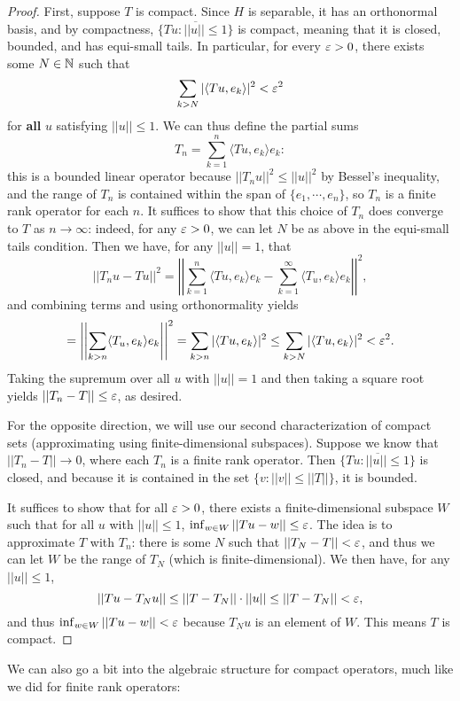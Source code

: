 \begin{proof}
First, suppose $T$ is compact. Since $H$ is separable, it has an orthonormal basis, and by compactness, $\overline{\{Tu: ||u|| \le 1\}}$ is compact, meaning that it is closed, bounded, and has equi-small tails. In particular, for every $\varepsilon > 0$, there exists some $N \in \mathbb N$ such that 
\[
    \sum_{k>N}|\langle Tu, e_k \rangle|^2 < \varepsilon^2
\]
for \textbf{all} $u$ satisfying $||u|| \le 1$. We can thus define the partial sums
\[
    T_n = \sum_{k=1}^n \langle Tu, e_k \rangle e_k:
\]
this is a bounded linear operator because $||T_n u||^2 \le ||u||^2$ by Bessel's inequality, and the range of $T_n$ is contained within the span of $\{e_1, \cdots, e_n\}$, so $T_n$ is a finite rank operator for each $n$. It suffices to show that this choice of $T_n$ does converge to $T$ as $n \to \infty$: indeed, for any $\varepsilon > 0$, we can let $N$ be as above in the equi-small tails condition. Then we have, for any $||u|| = 1$, that
\[
    ||T_n u - Tu||^2 = \left|\left| \sum_{k=1}^n \langle Tu, e_k \rangle e_k - \sum_{k=1}^{\infty} \langle T_u, e_k \rangle e_k \right|\right|^2,
\]
and combining terms and using orthonormality yields
\[
    = \left|\left| \sum_{k> n} \langle T_u, e_k \rangle e_k \right|\right|^2 = \sum_{k>n} |\langle Tu, e_k \rangle|^2 \le \sum_{k>N} |\langle Tu, e_k \rangle|^2 < \varepsilon^2.
\]
Taking the supremum over all $u$ with $||u|| = 1$ and then taking a square root yields $||T_n - T|| \le \varepsilon$, as desired.

For the opposite direction, we will use our second characterization of compact sets (approximating using finite-dimensional subspaces). Suppose we know that $||T_n - T|| \to 0$, where each $T_n$ is a finite rank operator. Then $\overline{\{Tu: ||u|| \le 1\}}$ is closed, and because it is contained in the set $\{v: ||v|| \le ||T||\}$, it is bounded.

It suffices to show that for all $\varepsilon > 0$, there exists a finite-dimensional subspace $W$ such that for all $u$ with $||u|| \le 1$, $\inf_{w \in W} ||Tu - w|| \le \varepsilon$. The idea is to approximate $T$ with $T_n$: there is some $N$ such that $||T_N - T|| < \varepsilon$, and thus we can let $W$ be the range of $T_N$ (which is finite-dimensional). We then have, for any $||u|| \le 1$,
\[
    ||Tu - T_Nu|| \le ||T - T_N|| \cdot ||u|| \le ||T - T_N|| < \varepsilon,
\]
and thus $\inf_{w \in W} ||Tu - w|| < \varepsilon$ because $T_Nu$ is an element of $W$. This means $T$ is compact. 
\end{proof}

We can also go a bit into the algebraic structure for compact operators, much like we did for finite rank operators:

